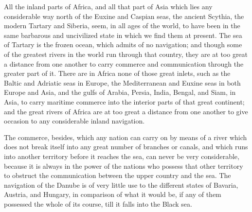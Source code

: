 All the inland parts of Africa, and all that part of Asia which lies any considerable way north of the Euxine and Caspian seas, the ancient Scythia, the modern Tartary and Siberia, seem, in all ages of the world, to have been in the same barbarous and uncivilized state in which we find them at present. The sea of Tartary is the frozen ocean, which admits of no navigation; and though some of the greatest rivers in the world run through that country, they are at too great a distance from one another to carry commerce and communication through the greater part of it. There are in Africa none of those great inlets, such as the Baltic and Adriatic seas in Europe, the Mediterranean and Euxine seas in both Europe and Asia, and the gulfs of Arabia, Persia, India, Bengal, and Siam, in Asia, to carry maritime commerce into the interior parts of that great continent; and the great rivers of Africa are at too great a distance from one another to give occasion to any considerable inland navigation.\par

The commerce, besides, which any nation can carry on by means of a river which does not break itself into any great number of branches or canals, and which runs into another territory before it reaches the sea, can never be very considerable, because it is always in the power of the nations who possess that other territory to obstruct the communication between the upper country and the sea. The navigation of the Danube is of very little use to the different states of Bavaria, Austria, and Hungary, in comparison of what it would be, if any of them possessed the whole of its course, till it falls into the Black sea.\par

\endgroup
